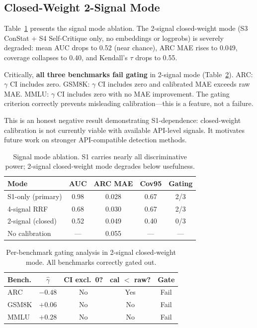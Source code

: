 \documentclass[11pt,a4paper]{article}
\newcommand{\ghat}{\hat{\gamma}}
\begin{document}
\subsection{Closed-Weight 2-Signal Mode}
\label{sec:closed_weight}

Table~\ref{tab:signal_ablation} presents the signal mode ablation. The 2-signal closed-weight mode (S3 ConStat + S4 Self-Critique only, no embeddings or logprobs) is severely degraded: mean AUC drops to 0.52 (near chance), ARC MAE rises to 0.049, coverage collapses to 0.40, and Kendall's $\tau$ drops to 0.55.

Critically, \textbf{all three benchmarks fail gating} in 2-signal mode (Table~\ref{tab:gating_2signal}). ARC: $\gamma$ CI includes zero. GSM8K: $\gamma$ CI includes zero and calibrated MAE exceeds raw MAE. MMLU: $\gamma$ CI includes zero with no MAE improvement. The gating criterion correctly prevents misleading calibration---this is a feature, not a failure.

This is an honest negative result demonstrating S1-dependence: closed-weight calibration is not currently viable with available API-level signals. It motivates future work on stronger API-compatible detection methods.

\begin{table}[t]
\centering
\small
\caption{Signal mode ablation. S1 carries nearly all discriminative power; 2-signal closed-weight mode degrades below usefulness.}
\label{tab:signal_ablation}
\begin{tabular}{lcccc}
\toprule
\textbf{Mode} & \textbf{AUC} & \textbf{ARC MAE} & \textbf{Cov95} & \textbf{Gating} \\
\midrule
S1-only (primary) & 0.98 & 0.028 & 0.67 & 2/3 \\
4-signal RRF & 0.68 & 0.030 & 0.67 & 2/3 \\
2-signal (closed) & 0.52 & 0.049 & 0.40 & 0/3 \\
No calibration & --- & 0.055 & --- & --- \\
\bottomrule
\end{tabular}
\end{table}

\begin{table}[t]
\centering
\small
\caption{Per-benchmark gating analysis in 2-signal closed-weight mode. All benchmarks correctly gated out.}
\label{tab:gating_2signal}
\begin{tabular}{lcccc}
\toprule
\textbf{Bench.} & $\ghat$ & \textbf{CI excl.\ 0?} & \textbf{cal $<$ raw?} & \textbf{Gate} \\
\midrule
ARC & $-0.48$ & No & Yes & Fail \\
GSM8K & $+0.06$ & No & No & Fail \\
MMLU & $+0.28$ & No & No & Fail \\
\bottomrule
\end{tabular}
\end{table}
\end{document}
